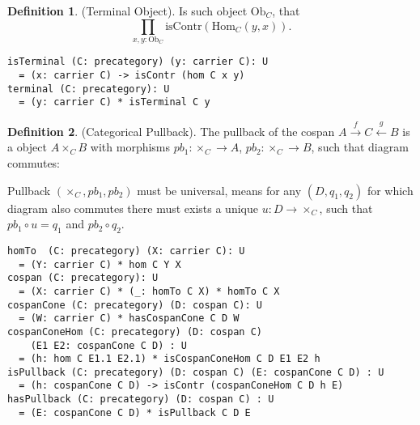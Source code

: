 \documentclass{article}
\theoremstyle{definition}
\newtheorem{definition}{Definition}
\def\mapright#1{\xrightarrow{{#1}}}
\def\mapleft#1{\xleftarrow{{#1}}}
\begin{document}
\begin{definition} (Terminal Object). Is such object $\mathrm{Ob}_C$,
that
$$
    \prod_{x,y:\mathrm{Ob}_C} \mathrm{isContr} (\mathrm{Hom}_C(y,x)).
$$
\begin{lstlisting}
isTerminal (C: precategory) (y: carrier C): U
  = (x: carrier C) -> isContr (hom C x y)
terminal (C: precategory): U
  = (y: carrier C) * isTerminal C y
\end{lstlisting}
\end{definition}

\begin{definition} (Categorical Pullback).
The pullback of the cospan $A \mapright{f} C \mapleft{g} B$ is a object $A \times_{C} B$ with
morphisms $pb_1 : \times_C \rightarrow A $, $pb_2 : \times_C \rightarrow B$, such that
diagram commutes:
\begin{center}
\end{center}
Pullback $(\times_C,pb_1,pb_2)$ must be universal, means for any $(D,q_1,q_2)$
for which diagram also commutes there must exists a unique $u: D \rightarrow \times_C$,
such that $pb_1 \circ u = q_1$ and $pb_2 \circ q_2$.
\begin{lstlisting}
homTo  (C: precategory) (X: carrier C): U
  = (Y: carrier C) * hom C Y X
cospan (C: precategory): U
  = (X: carrier C) * (_: homTo C X) * homTo C X
cospanCone (C: precategory) (D: cospan C): U
  = (W: carrier C) * hasCospanCone C D W
cospanConeHom (C: precategory) (D: cospan C)
    (E1 E2: cospanCone C D) : U
  = (h: hom C E1.1 E2.1) * isCospanConeHom C D E1 E2 h
isPullback (C: precategory) (D: cospan C) (E: cospanCone C D) : U
  = (h: cospanCone C D) -> isContr (cospanConeHom C D h E)
hasPullback (C: precategory) (D: cospan C) : U
  = (E: cospanCone C D) * isPullback C D E
\end{lstlisting}
\end{definition}


\end{document}
